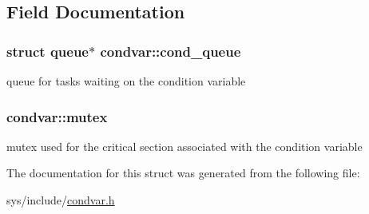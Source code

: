 \subsection{Field Documentation}
\hypertarget{structcondvar_abf91dd97763d95af19ee92a17f55afb8}{
\subsubsection[{cond\-\_\-queue}]{\setlength{\rightskip}{0pt plus 5cm}struct {\bf queue}$\ast$ condvar\-::cond\-\_\-queue}}\label{structcondvar_abf91dd97763d95af19ee92a17f55afb8}
queue for tasks waiting on the condition variable \hypertarget{structcondvar_a573f1b5d528d692d581b734913807b66}{
\subsubsection[{mutex}]{ condvar\-::mutex}}\label{structcondvar_a573f1b5d528d692d581b734913807b66}
mutex used for the critical section associated with the condition variable 

The documentation for this struct was generated from the following file\-:\begin{DoxyCompactItemize}
\item 
sys/include/\hyperlink{condvar_8h}{condvar.\-h}\end{DoxyCompactItemize}
